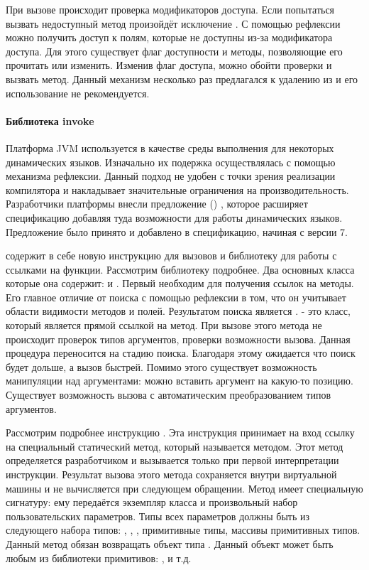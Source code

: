 При вызове происходит проверка модификаторов доступа. Если попытаться вызвать недоступный метод произойдёт исключение . С помощью рефлексии можно получить доступ к полям, которые не доступны из-за модификатора доступа. Для этого существует флаг доступности и методы, позволяющие его прочитать или изменить. Изменив флаг доступа, можно обойти проверки и вызвать метод. Данный механизм несколько раз предлагался к удалению из  и его использование не рекомендуется.

\paragraph{Библиотека invoke}
  Платформа JVM используется в качестве среды выполнения для некоторых динамических языков. Изначально их подержка осуществлялась с помощью механизма рефлексии. Данный подход не удобен с точки зрения реализации компилятора и накладывает значительные ограничения на производительность. Разработчики платформы внесли предложение () , которое расширяет спецификацию  добавляя туда возможности для работы динамических языков\cite{jvm:jsr292}. Предложение было принято и добавлено в спецификацию, начиная с версии 7.

 содержит в себе новую инструкцию для вызовов  и библиотеку для работы с ссылками на функции. Рассмотрим библиотеку подробнее. Два основных класса которые она содержит:  и . Первый необходим для получения ссылок на методы. Его главное отличие от поиска с помощью рефлексии в том, что он учитывает области видимости методов и полей. Результатом поиска является .  - это класс, который является прямой ссылкой на метод. При вызове этого метода не происходит проверок типов аргументов, проверки возможности вызова. Данная процедура переносится на стадию поиска. Благодаря этому ожидается что поиск будет дольше, а вызов быстрей. Помимо этого существует возможность манипуляции над аргументами: можно вставить аргумент на какую-то позицию. Существует возможность вызова с автоматическим преобразованием типов аргументов.

Рассмотрим подробнее инструкцию . Эта инструкция принимает на вход ссылку на специальный статический метод, который называется  методом. Этот метод определяется разработчиком и вызывается только при первой интерпретации инструкции. Результат вызова этого метода сохраняется внутри виртуальной машины и не вычисляется при следующем обращении. Метод имеет специальную сигнатуру: ему передаётся экземпляр класса  и произвольный набор пользовательских параметров. Типы всех параметров должны быть из следующего набора типов: , , , примитивные типы, массивы примитивных типов. Данный метод обязан возвращать объект типа . Данный объект может быть любым  из библиотеки примитивов: ,  и т.д.

